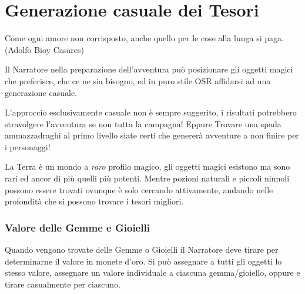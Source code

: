 \section{Generazione casuale dei Tesori}\label{generazionetesorimagici}\hypertarget{generazionetesorimagici}{}

\begin{enfasi}
{Come ogni amore non corrisposto, anche quello per le cose alla lunga si paga. (Adolfo Bioy Casares)}
\end{enfasi}

\begin{multicols}{2}

Il Narratore nella preparazione dell'avventura può posizionare gli oggetti magici che preferisce, che ce ne sia bisogno, ed in puro stile OSR affidarsi ad una generazione casuale.

L'approccio esclusivamente casuale non è sempre suggerito, i risultati potrebbero stravolgere l'avventura se non tutta la campagna!
Eppure Trovare una spada ammazzadraghi al primo livello siate certi che genererà avventure a non finire per i personaggi!

\begin{giocatore}[Tessssori!]
La Terra è un mondo a \emph{raro} profilo magico, gli oggetti magici esistono ma sono rari ed ancor di più quelli più potenti. Mentre pozioni naturali e piccoli ninnoli possono essere trovati ovunque è solo cercando attivamente, andando nelle profondità che si possono trovare i tesori migliori.
\end{giocatore}

\subsubsection{Valore delle Gemme e Gioielli}\hypertarget{valoredellegemme}{}\label{valoredellegemme}\hypertarget{valoredeigioielli}{}\label{valoredeigioielli}

Quando vengono trovate delle Gemme o Gioielli il Narratore deve tirare per determinarne il valore in monete d'oro. Si può assegnare a tutti gli oggetti lo stesso valore, assegnare un valore individuale a ciascuna gemma/gioiello, oppure e tirare casualmente per ciascuno.

\medskip

\setlength{\parindent}{0cm}{

}
\end{multicols}
